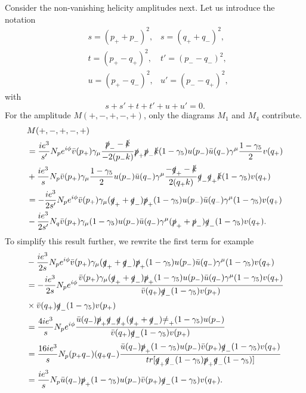 Consider the non-vanishing helicity amplitudes next. Let us introduce the notation
\begin{eqnarray}
&s=(p_++p_-)^2, &s=(q_++q_-)^2,\nonumber\\
&t=(p_+-q_+)^2, &t'=(p_--q_-)^2,\nonumber\\
&u=(p_+-q_-)^2, &u'=(p_--q_+)^2,
\end{eqnarray}
with
\begin{equation}
s+s'+t+t'+u+u'=0.
\end{equation}
For the amplitude $M(+,-,+,-,+)$, only the diagrams $M_1$ and $M_4$ contribute.
\begin{align}
&M(+,-,+,-,+)\nonumber\\
&=\frac{ie^3}{s'}N_pe^{i\phi}\bar{v}(p_+)\gamma_\mu\frac{\slashed p_--\slashed k}{-2(p_-k)}\slashed p_+\slashed p_-\slashed k(1-\gamma_5)u(p_-)\bar{u}(q_-)\gamma^\mu\frac{1-\gamma_5}{2}v(q_+)\nonumber\\
&+\frac{ie^3}{s}N_p\bar{v}(p_+)\gamma_\mu\frac{1-\gamma_5}{2}u(p_-)\bar{u}(q_-)\gamma^\mu\frac{-\slashed q_+-\slashed k}{2(q_+k)}\slashed q_-\slashed q_+\slashed k(1-\gamma_5)v(q_+)\nonumber\\
&=-\frac{ie^3}{2s'}N_pe^{i\phi}\bar{v}(p_+)\gamma_\mu(\slashed q_++\slashed q_-)\slashed p_+(1-\gamma_5)u(p_-)\bar{u}(q_-)\gamma^\mu(1-\gamma_5)v(q_+)\nonumber\\
&-\frac{ie^3}{2s'}N_q\bar{v}(p_+)\gamma_\mu(1-\gamma_5)u(p_-)\bar{u}(q_-)\gamma^\mu(\slashed p_++\slashed p_-)\slashed q_-(1-\gamma_5)v(q_+).\nonumber\\
\end{align}
To simplify this result further, we rewrite the first term for example
\begin{align}
&-\frac{ie^3}{2s}N_pe^{i\phi}\bar{v}(p_+)\gamma_\mu(\slashed q_++\slashed q_-)\slashed p_+(1-\gamma_5)u(p_-)\bar{u}(q_-)\gamma^\mu(1-\gamma_5)v(q_+)\nonumber\\
&=-\frac{ie^3}{2s}N_pe^{i\phi}\frac{\bar{v}(p_+)\gamma_\mu(\slashed q_++\slashed q_-)\slashed p_+(1-\gamma_5)u(p_-)\bar{u}(q_-)\gamma^\mu(1-\gamma_5) v(q_+)}{\bar{v}(q_+)\slashed q_-(1-\gamma_5)v(p_+)}\nonumber\\
&\times \bar{v}(q_+)\slashed q_-(1-\gamma_5)v(p_+)\nonumber\\
&=\frac{4ie^3}{s}N_pe^{i\phi}\frac{\bar{u}(q_-)\slashed p_+\slashed q_-\slashed q_+(\slashed q_++\slashed q_-)\slashed =_+(1-\gamma_5)u(p_-)}{\bar{v}(q_+)\slashed q_-(1-\gamma_5)v(p_+)}\nonumber\\
&=\frac{16ie^3}{s}N_p(p_+q_-)(q_+q_-)\frac{\bar{u}(q_-)\slashed p_+(1-\gamma_5)u(p_-)\bar{v}(p_+)\slashed q_-(1-\gamma_5)v(q_+)}{tr[\slashed q_+\slashed q_-(1-\gamma_5)\slashed p_+\slashed q_-(1-\gamma_5)]}\nonumber\\
&=\frac{ie^3}{s}N_p\bar{u}(q_-)\slashed p_+(1-\gamma_5)u(p_-)\bar{v}(p_+)\slashed q_-(1-\gamma_5)v(q_+).
\end{align}

